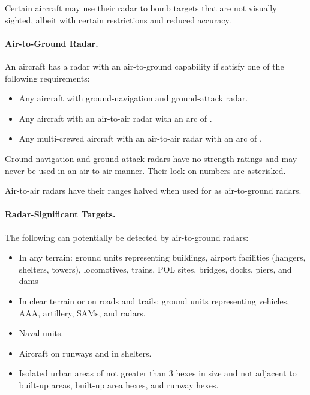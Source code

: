 \begin{advancedrules}
{Certain aircraft may use their radar to bomb targets that are not visually sighted, albeit with certain restrictions and reduced accuracy.

\paragraph{Air-to-Ground Radar.} An aircraft has a radar with an air-to-ground capability if satisfy one of the following requirements: 
\begin{itemize}
\item Any aircraft with ground-navigation and ground-attack radar.
\item Any aircraft with an air-to-air radar with an arc of .
\item Any multi-crewed aircraft with an air-to-air radar with an arc of .
\end{itemize}

Ground-navigation and ground-attack radars have no strength ratings and may never be used in an air-to-air manner. Their lock-on numbers are asterisked.

Air-to-air radars have their ranges halved when used for as air-to-ground radars.

\paragraph{Radar-Significant Targets.} The following can potentially be detected by air-to-ground radars:

\begin{itemize}

    \item In any terrain: ground units representing buildings, airport facilities (hangers, shelters, towers), locomotives, trains, POL sites, bridges, docks, piers, and dams

    \item In clear terrain or on roads and trails: ground units representing vehicles, AAA, artillery, SAMs, and radars.

    \item Naval units.

    \item Aircraft on runways and in shelters.

    \item Isolated urban areas of not greater than 3 hexes in size and not adjacent to built-up areas, built-up area hexes, and runway hexes.
    

\end{itemize}}
\end{advancedrules}

